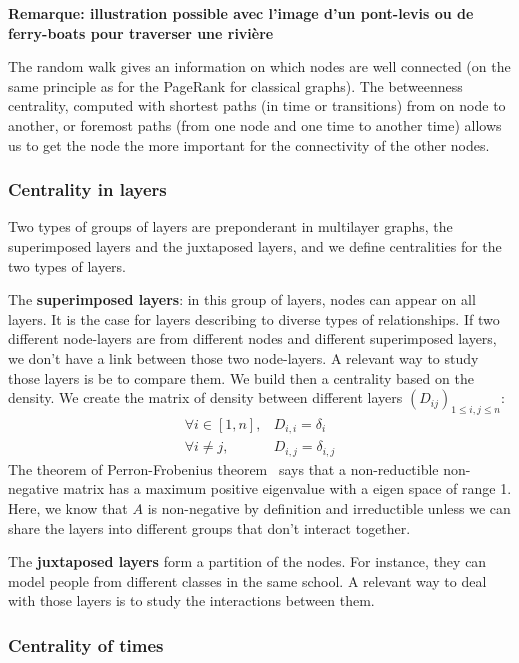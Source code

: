 \documentclass{svproc}
\begin{document}
\textbf{Remarque: illustration possible avec l'image d'un pont-levis ou de ferry-boats pour traverser une rivière}

The random walk gives an information on which nodes are well connected (on the same principle as for the PageRank for classical graphs). The betweenness centrality, computed with shortest paths (in time or transitions) from on node to another, or foremost paths (from one node and one time to another time) allows us to get the node the more important for the connectivity of the other nodes. 



\subsubsection{Centrality in layers}

Two types of groups of layers are preponderant in multilayer graphs, the superimposed layers and the juxtaposed layers, and we define centralities for the two types of layers.

The {\bf superimposed layers}: in this group of layers, nodes can appear on all layers. It is the case for layers describing to diverse types of relationships. If two different node-layers are from different nodes and different superimposed layers, we don't have a link between those two node-layers. A relevant way to study those layers is be to compare them.
We build then a centrality based on the density. We create the matrix of density between different layers $(D_{ij})_{1\leq i,j\leq n}$:
\begin{align*}
\forall i \in [1,n], & D_{i,i} = \delta_i \\
\forall i \neq j , & D_{i,j} = \delta_{i,j}
\end{align*}
The theorem of Perron-Frobenius theorem~\cite{perron,frobenius} says that a non-reductible non-negative matrix has a maximum positive eigenvalue with a eigen space of range 1. Here, we know that $A$ is non-negative by definition and irreductible unless we can share the layers into different groups that don't interact together.

The {\bf juxtaposed layers} form a partition of the nodes. For instance, they can model people from different classes in the same school. A relevant way to deal with those layers is to study the interactions between them.


\subsubsection{Centrality of times}
%
\end{document}
